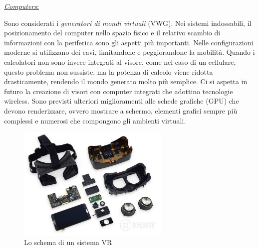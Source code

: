 \newpage

\begin{flushleft}
	\underline{\textit{Computers}:}
\end{flushleft} Sono considerati i \textit{generatori di mondi virtuali} (VWG). Nei sistemi indossabili, il posizionamento del computer nello spazio fisico e il relativo scambio di informazioni con la periferica sono gli aspetti più importanti. Nelle configurazioni moderne si utilizzano dei cavi, limitandone e peggiorandone la mobilità. Quando i calcolatori non sono invece integrati al visore, come nel caso di un cellulare, questo problema non sussiste, ma la potenza di calcolo viene ridotta drasticamente, rendendo il mondo generato molto più semplice. Ci si aspetta in futuro la creazione di visori con computer integrati che adottino tecnologie wireless. Sono previsti ulteriori miglioramenti alle schede grafiche (GPU) che devono renderizzare, ovvero mostrare a schermo, elementi grafici sempre più complessi e numerosi che compongono gli ambienti virtuali.

\begin{figure}[H]
	\includegraphics[width=0.65\textwidth]{figure/VisoreHW}
	\centering
	\caption{Lo schema di un sistema VR}
\end{figure}



